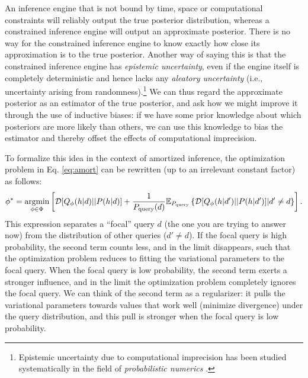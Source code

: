An inference engine that is not bound by time, space or computational constraints will reliably output the true posterior distribution, whereas a constrained inference engine will output an approximate posterior. There is no way for the constrained inference engine to know exactly how close its approximation is to the true posterior. Another way of saying this is that the constrained inference engine has \emph{epistemic uncertainty}, even if the engine itself is completely deterministic and hence lacks any \emph{aleatory uncertainty} (i.e., uncertainty arising from randomness).\footnote{Epistemic uncertainty due to computational imprecision has been studied systematically in the field of \emph{probabilistic numerics} \citep{hennig2015probabilistic}.} We can thus regard the approximate posterior as an estimator of the true posterior, and ask how we might improve it through the use of inductive biases: if we have some prior knowledge about which posteriors are more likely than others, we can use this knowledge to bias the estimator and thereby offset the effects of computational imprecision.

To formalize this idea in the context of amortized inference, the optimization problem in Eq. \ref{eq:amort} can be rewritten (up to an irrelevant constant factor) as follows:
\begin{align}
\phi^\ast = \operatorname*{argmin}_{\phi \in \Phi} \left[
\mathcal{D}[Q_\phi(h|d)||P(h|d)] + \frac{1}{P_\text{query}(d)} \mathbb{E}_{P_\text{query}} \left\{ \mathcal{D}[Q_\phi(h|d')||P(h|d')] | d' \neq d \right \} \right].
\end{align}
This expression separates a ``focal'' query $d$ (the one you are trying to answer now) from the distribution of other queries ($d' \neq d$). If the focal query is high probability, the second term counts less, and in the limit disappears, such that the optimization problem reduces to fitting the variational parameters to the focal query. When the focal query is low probability, the second term exerts a stronger influence, and in the limit the optimization problem completely ignores the focal query. We can think of the second term as a regularizer: it pulls the variational parameters towards values that work well (minimize divergence) under the query distribution, and this pull is stronger when the focal query is low probability.

